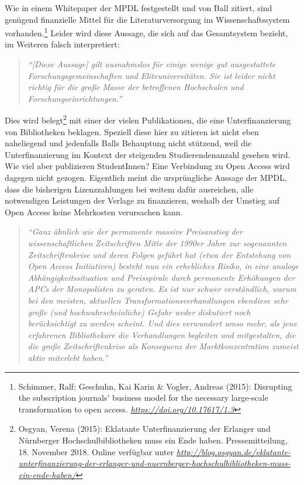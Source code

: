 \documentclass[a4paper,
fontsize=11pt,
oneside,
numbers=noperiodatend,
parskip=half-,
bibliography=totoc,
final
]{scrartcl}
\begin{document}
Wie in einem Whitepaper der MPDL festgestellt und von Ball zitiert, sind
genügend finanzielle Mittel für die Literaturversorgung im
Wissenschaftssystem vorhanden.\footnote{Schimmer, Ralf; Geschuhn, Kai
  Karin \& Vogler, Andreas (2015): Disrupting the subscription journals'
  business model for the necessary large-scale transformation to open
  access.
  \href{https://doi.org/10.17617/1.3}{\emph{https://doi.org/10.17617/1.3}}}
Leider wird diese Aussage, die sich auf das Gesamtsystem bezieht, im
Weiteren falsch interpretiert:

\begin{quote}
\emph{\enquote{{[}Diese Aussage{]} gilt ausnahmslos für einige wenige
gut ausgestattete Forschungsgemeinschaften und Eliteuniversitäten. Sie
ist leider nicht richtig für die große Masse der betroffenen Hochschulen
und Forschungseinrichtungen.}}
\end{quote}

Dies wird belegt\footnote{Osgyan, Verena (2015): Eklatante
  Unterfinanzierung der Erlanger und Nürnberger Hochschulbibliotheken
  muss ein Ende haben. Pressemitteilung, 18. November 2018. Online
  verfügbar unter
  \href{http://blog.osgyan.de/eklatante-unterfinanzierung-der-erlanger-und-nuernberger-hochschulbibliotheken-muss-ein-ende-haben/}{\emph{http://blog.osgyan.de/eklatante-unterfinanzierung-der-erlanger-und-nuernberger-hochschulbibliotheken-muss-ein-ende-haben/}}}
mit einer der vielen Publikationen, die eine Unterfinanzierung von
Bibliotheken beklagen. Speziell diese hier zu zitieren ist nicht eben
naheliegend und jedenfalls Balls Behauptung nicht stützend, weil die
Unterfinanzierung im Kontext der steigenden Studierendenanzahl gesehen
wird. Wie viel aber publizieren StudentInnen? Eine Verbindung zu Open
Access wird dagegen nicht gezogen. Eigentlich meint die ursprüngliche
Aussage der MPDL, dass die bisherigen Lizenzzahlungen bei weitem dafür
ausreichen, alle notwendigen Leistungen der Verlage zu finanzieren,
weshalb der Umstieg auf Open Access keine Mehrkosten verursachen kann.

\begin{quote}
\emph{\enquote{Ganz ähnlich wie der permanente massive Preisanstieg der
wissenschaftlichen Zeitschriften Mitte der 1990er Jahre zur sogenannten
Zeitschriftenkrise und deren Folgen geführt hat (etwa der Entstehung von
Open Access Initiativen) besteht nun ein erhebliches Risiko, in eine
analoge Abhängigkeitssituation und Preisspirale durch permanente
Erhöhungen der APCs der Monopolisten zu geraten. Es ist nur schwer
verständlich, warum bei den meisten, aktuellen
Transformationsverhandlungen ebendiese sehr große (und
hochwahrscheinliche) Gefahr weder diskutiert noch berücksichtigt zu
werden scheint. Und dies verwundert umso mehr, als jene erfahrenen
Bibliothekare die Verhandlungen begleiten und mitgestalten, die die
große Zeitschriftenkrise als Konsequenz der Marktkonzentration zumeist
aktiv miterlebt haben.}}
\end{quote}
\end{document}
